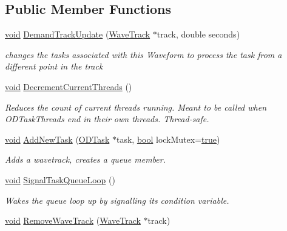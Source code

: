 \subsection*{Public Member Functions}
\begin{DoxyCompactItemize}
\item 
\hyperlink{sound_8c_ae35f5844602719cf66324f4de2a658b3}{void} \hyperlink{class_o_d_manager_ae41ea7d62f686735fffdda90d55d50fd}{Demand\+Track\+Update} (\hyperlink{class_wave_track}{Wave\+Track} $\ast$track, double seconds)
\begin{DoxyCompactList}\small\item\em changes the tasks associated with this Waveform to process the task from a different point in the track \end{DoxyCompactList}\item 
\hyperlink{sound_8c_ae35f5844602719cf66324f4de2a658b3}{void} \hyperlink{class_o_d_manager_a31d6075d78f9ccd59fbbd3abdc4c2f33}{Decrement\+Current\+Threads} ()
\begin{DoxyCompactList}\small\item\em Reduces the count of current threads running. Meant to be called when O\+D\+Task\+Threads end in their own threads. Thread-\/safe. \end{DoxyCompactList}\item 
\hyperlink{sound_8c_ae35f5844602719cf66324f4de2a658b3}{void} \hyperlink{class_o_d_manager_ab635811e9a08a5e4b14a6736ad83c885}{Add\+New\+Task} (\hyperlink{class_o_d_task}{O\+D\+Task} $\ast$task, \hyperlink{mac_2config_2i386_2lib-src_2libsoxr_2soxr-config_8h_abb452686968e48b67397da5f97445f5b}{bool} lock\+Mutex=\hyperlink{mac_2config_2i386_2lib-src_2libsoxr_2soxr-config_8h_a41f9c5fb8b08eb5dc3edce4dcb37fee7}{true})
\begin{DoxyCompactList}\small\item\em Adds a wavetrack, creates a queue member. \end{DoxyCompactList}\item 
\hyperlink{sound_8c_ae35f5844602719cf66324f4de2a658b3}{void} \hyperlink{class_o_d_manager_a32c0166c84f2b50792d96ab36ea02401}{Signal\+Task\+Queue\+Loop} ()
\begin{DoxyCompactList}\small\item\em Wakes the queue loop up by signalling its condition variable. \end{DoxyCompactList}\item 
\hyperlink{sound_8c_ae35f5844602719cf66324f4de2a658b3}{void} \hyperlink{class_o_d_manager_a9f273cddbbf88ab5f10d83ef71412260}{Remove\+Wave\+Track} (\hyperlink{class_wave_track}{Wave\+Track} $\ast$track)

\end{DoxyCompactItemize}
